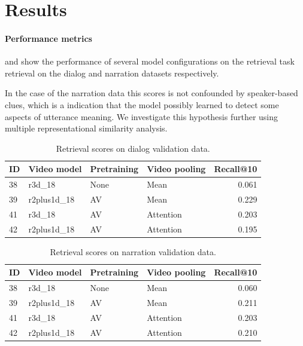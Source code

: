 \section{Results}
\label{sec:results}
\paragraph{Performance metrics}
 and  show
the performance of several model configurations on the retrieval task
retrieval on the dialog and narration datasets respectively.


In the case of the narration data this scores is not confounded by
speaker-based clues, which is a indication that the model possibly
learned to detect some aspects of utterance meaning. We investigate
this hypothesis further using multiple representational similarity
analysis.
 

 \begin{table}
   \centering
   \begin{tabular}{llllr}
     \toprule
     ID & Video model  & Pretraining & Video pooling & Recall@10 \\\midrule
     38 & r3d\_18      & None       & Mean          & 0.061     \\
     39 & r2plus1d\_18 & AV         & Mean          & 0.229     \\
     41 & r3d\_18      & AV         & Attention     & 0.203     \\
     42 & r2plus1d\_18 & AV         & Attention     & 0.195    \\\bottomrule
   \end{tabular}
   \caption{Retrieval scores on dialog validation data.}
   \label{tab:retrieval-dialog}
 \end{table}

\begin{table}
   \centering
   \begin{tabular}{llllr}
     \toprule
     ID & Video model  & Pretraining & Video pooling &  Recall@10 \\\midrule
     38 & r3d\_18      & None        & Mean          &  0.060  \\
     39 & r2plus1d\_18 & AV          & Mean          &  0.211  \\
     41 & r3d\_18      & AV          & Attention     &  0.203  \\
     42 & r2plus1d\_18 & AV          & Attention     &  0.210  \\\bottomrule     
   \end{tabular}
   \caption{Retrieval scores on narration validation data.}
   \label{tab:retrieval-narration}
 \end{table}
 

